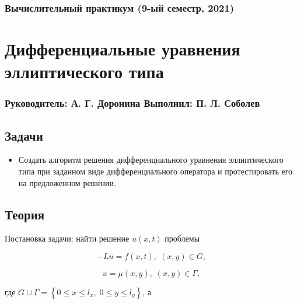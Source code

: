 





\subsubsection*{Вычислительный практикум (9-ый семестр, 2021)}
\section*{Дифференциальные уравнения эллиптического типа}
\subsubsection*{Руководитель: А. Г. Доронина \hspace{2em} Выполнил: П. Л. Соболев}

\vspace{3em}

\subsection*{Задачи}

\begin{itemize}
  \setlength\itemsep{-0.1em}
  \item Создать алгоритм решения дифференциального уравнения эллиптического типа при заданном виде дифференциального оператора и протестировать его на предложенном решении.
\end{itemize}

\subsection*{Теория}

Постановка задачи: найти решение $ u(x, t) $ проблемы

\su
\begin{equation}
  -L u = f(x, t), \; (x, y) \in G,
\end{equation}

\su\su
\begin{equation}
  u = \mu (x, y), \; (x, y) \in \Gamma,
\end{equation}

где $ G \cup \Gamma = \left\{ 0 \leqslant x \leqslant l_x, \; 0 \leqslant y \leqslant l_y \right\} $, а

